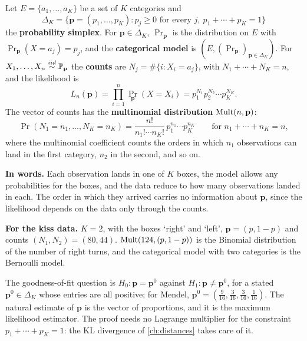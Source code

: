 \begin{definition}
\label{def:categorical}
Let $E = \{a_1, \ldots, a_K\}$ be a set of $K$ categories and
\[
\Delta_K = \big\{\mathbf{p} = (p_1, \ldots, p_K) : p_j \geq 0 \text{ for every } j,\ p_1 + \cdots + p_K = 1\big\}
\]
the \textbf{probability simplex}.
For $\mathbf{p} \in \Delta_K$, $\Pr_{\mathbf{p}}$ is the distribution on $E$ with $\Pr_{\mathbf{p}}(X = a_j) = p_j$, and the \textbf{categorical model} is $(E, (\Pr_{\mathbf{p}})_{\mathbf{p} \in \Delta_K})$.
For $X_1, \ldots, X_n \stackrel{iid}{\sim} \mathbb{P}_{\mathbf{p}}$ the \textbf{counts} are $N_j = \#\{i : X_i = a_j\}$, with $N_1 + \cdots + N_K = n$, and the likelihood is
\[
L_n(\mathbf{p}) = \prod_{i=1}^n \Pr_{\mathbf{p}}(X = X_i) = p_1^{N_1}p_2^{N_2}\cdots p_K^{N_K}.
\]
The vector of counts has the \textbf{multinomial distribution} $\mathrm{Mult}(n, \mathbf{p})$:
\[
\Pr(N_1 = n_1, \ldots, N_K = n_K) = \frac{n!}{n_1!\cdots n_K!}\,p_1^{n_1}\cdots p_K^{n_K} \qquad \text{for } n_1 + \cdots + n_K = n,
\]
where the multinomial coefficient counts the orders in which $n_1$ observations can land in the first category, $n_2$ in the second, and so on.
\end{definition}

\begin{inwords}
\textbf{In words.} Each observation lands in one of $K$ boxes, the model allows any probabilities for the boxes, and the data reduce to how many observations landed in each. The order in which they arrived carries no information about $\mathbf{p}$, since the likelihood depends on the data only through the counts.
\par\smallskip
\textbf{For the kiss data.} $K = 2$, with the boxes `right' and `left', $\mathbf{p} = (p, 1 - p)$ and counts $(N_1, N_2) = (80, 44)$. $\mathrm{Mult}(124, (p, 1 - p))$ is the Binomial distribution of the number of right turns, and the categorical model with two categories is the Bernoulli model.
\end{inwords}

The goodness-of-fit question is $H_0: \mathbf{p} = \mathbf{p}^0$ against $H_1: \mathbf{p} \neq \mathbf{p}^0$, for a stated $\mathbf{p}^0 \in \Delta_K$ whose entries are all positive; for Mendel, $\mathbf{p}^0 = (\frac{9}{16}, \frac{3}{16}, \frac{3}{16}, \frac{1}{16})$.
The natural estimate of $\mathbf{p}$ is the vector of proportions, and it is the maximum likelihood estimator.
The proof needs no Lagrange multiplier for the constraint $p_1 + \cdots + p_K = 1$: the KL divergence of \cref{ch:distances} takes care of it.

